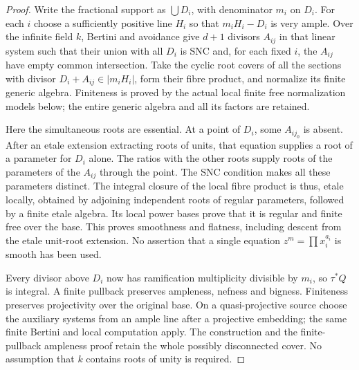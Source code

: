 \begin{proof}
Write the fractional support as $\bigcup D_i$, with denominator $m_i$
on $D_i$.  For each $i$ choose a sufficiently positive line $H_i$ so
that $m_iH_i-D_i$ is very ample.  Over the infinite field $k$, Bertini
and avoidance give $d+1$ divisors $A_{ij}$ in that linear system such
that their union with all $D_i$ is SNC and, for each fixed $i$, the
$A_{ij}$ have empty common intersection.  Take the cyclic root covers
of all the sections with divisor $D_i+A_{ij}\in|m_iH_i|$, form their
fibre product, and normalize its finite generic algebra.  Finiteness
is proved by the actual local finite free normalization models below;
the entire generic algebra and all its factors are retained.

Here the simultaneous roots are essential.  At a point of $D_i$, some
$A_{ij_0}$ is absent.  After an etale extension extracting roots of
units, that equation supplies a root of a parameter for $D_i$ alone.
The ratios with the other roots supply roots of the parameters of
the $A_{ij}$ through the point.  The SNC condition makes all these
parameters distinct.  The integral closure of the local fibre product
is thus, etale locally, obtained by adjoining independent roots of
regular parameters, followed by a finite etale algebra.  Its local
power bases prove that it is regular and finite free over the base.
This proves smoothness and flatness, including descent from the etale
unit-root extension.  No assertion that a single equation
$z^m=\prod x_i^{a_i}$ is smooth has been used.

Every divisor above $D_i$ now has ramification multiplicity divisible
by $m_i$, so $\tau^*Q$ is integral.  A finite pullback preserves
ampleness, nefness and bigness.  Finiteness preserves projectivity
over the original base.  On a quasi-projective source choose the
auxiliary systems from an ample line after a projective embedding;
the same finite Bertini and local computation apply.  The construction and the finite-pullback ampleness proof retain the
whole possibly disconnected cover. No assumption that $k$ contains
roots of unity is required.
\end{proof}

